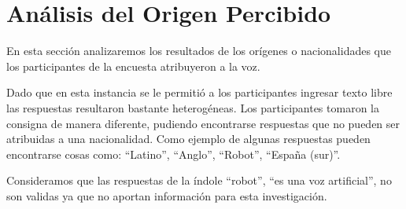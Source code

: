 




\clearpage
\section{Análisis del Origen Percibido}

En esta sección analizaremos los resultados de los orígenes o nacionalidades que los participantes de la encuesta atribuyeron a la voz.

Dado que en esta instancia se le permitió a los participantes ingresar texto libre las respuestas resultaron bastante heterogéneas. Los participantes tomaron la consigna de manera diferente, pudiendo encontrarse respuestas que no pueden ser atribuidas a una nacionalidad. Como ejemplo de algunas respuestas pueden encontrarse cosas como: ``Latino'', ``Anglo'', ``Robot'', ``España (sur)''.

Consideramos que las respuestas de la índole ``robot'', ``es una voz artificial'', no son validas ya que no aportan información para esta investigación.

